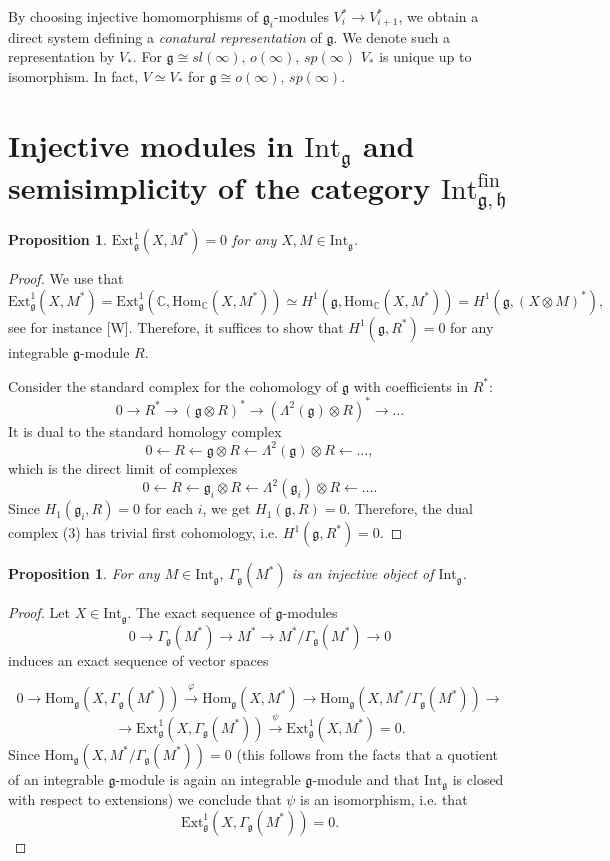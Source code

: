 \documentclass{birkmult}
\newcounter{theorem}
\newtheorem{prop}[theo]{Proposition}
\newcommand{\hh}{\mathfrak{h}}
\renewcommand{\gg}{\mathfrak{g}}
\renewcommand {\phi} {\varphi}
\newcommand{\ext}{\mathrm{Ext}}
\newcommand{\Int}{\mathrm{Int}}
\newcommand{\Intfin}{\Int^{\mathrm{fin}}_{\gg,\hh}}
\renewcommand{\hom}{\mathrm{Hom}}
\begin{document}
By choosing injective homomorphisms of $\gg_i$-modules $V^*_i\to
V^*_{i+1}$, we obtain a direct system defining a {\it conatural
representation} of $\gg$. We denote such a representation by
$V_*$. For $\gg\cong sl(\infty),\,o(\infty),\,sp(\infty)$ $V_*$ is
unique up to isomorphism. In fact, $V\simeq V_*$ for $\gg\cong
o(\infty),\,sp(\infty)$.


\section{Injective modules in $\Int_\gg$ and semisimplicity of the
  category $\Intfin$}


\begin{prop}\label{ext}
$\ext^1_\gg (X,M^*)=0$ for any $X,M\in \Int_\gg$.
\end{prop}
\begin{proof} We use that
$$\ext^1_\gg (X,M^*)=\ext^1_\gg (\mathbb{C},\hom_\mathbb
C(X,M^*))\simeq H^1(\gg,\hom_\mathbb
C(X,M^*))=H^1(\gg,(X\otimes M)^*),$$ see for instance [W].
Therefore, it suffices to show
that $H^1(\gg,R^*)=0$ for any integrable $\gg$-module $R$.

Consider the standard complex for the cohomology of $\gg$ with
coefficients in $R^*$:
\begin{equation}
0\to R^* \to (\gg\otimes R)^* \to (\Lambda^2(\gg)\otimes R)^*\to\dots
\end{equation}
It is dual to the standard homology complex
$$0\gets R \gets \gg\otimes R \gets \Lambda^2(\gg)\otimes R \gets \dots,$$
which is the direct limit of complexes
$$0\gets R \gets \gg_i\otimes R \gets \Lambda^2(\gg_i)\otimes R \gets \dots.$$
Since $H_1(\gg_i,R)=0$ for each $i$, we get $H_1(\gg,R)=0$.
Therefore, the dual complex (3) has trivial first cohomology, i.e.
$H^1(\gg,R^*)=0$.
\end{proof}

\begin{prop}\label{inj}
For any $M\in\Int_\gg$, $\Gamma_{\gg}(M^*)$ is an injective object of $\Int_\gg$.
\end{prop}
\begin{proof}
Let $X\in \Int_\gg$. The exact sequence of $\gg$-modules
$$0\to\Gamma_{\gg}(M^*)\to M^*\to M^*/\Gamma_{\gg}(M^*)\rightarrow 0$$ induces an exact sequence of vector spaces

$$
0\to\hom_{\gg}(X,\Gamma_{\gg}(M^*))\stackrel{\phi}{\to}\hom_{\gg}(X,M^*)\to
\hom_{\gg} (X,M^*/\Gamma_{\gg}(M^*))\to$$
$$
\to\ext^1_{\gg}(X,\Gamma_{\gg}(M^*))\stackrel{\psi}{\to}\ext^1_{\gg}(X,M^*)=0.
$$ Since $\hom_{\gg}(X, M^*/\Gamma_{\gg}(M^*))=0$ (this follows from the facts that a quotient of an integrable $\gg$-module is again an integrable $\gg$-module and that $\Int_{\gg}$ is closed with respect to extensions) we conclude that $\psi$ is an isomorphism, i.e. that $$\ext^1_{\gg}(X,\Gamma_{\gg}(M^*))=0.$$ \end{proof}
\end{document}
